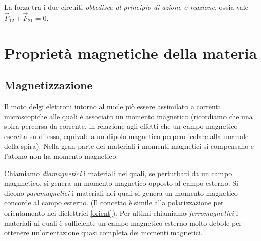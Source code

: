 \documentclass[x11names]{report}
\begin{document}
La forza tra i due circuiti \textit{obbedisce al principio di azione e reazione}, ossia vale \(\vec{F}_{12} + \vec{F}_{21} = 0\).


\newpage
\section{Proprietà magnetiche della materia}

\subsection{Magnetizzazione}
Il moto delgi elettroni intorno al nucle piò essere assimilato a correnti microscopiche alle quali è associato un momento magnetico (ricordiamo che una spira percorsa da corrente, in relazione agli effetti che un campo magnetico esercita su di essa, equivale a un dipolo magnetico perpendicolare alla normale della spira). Nella gran parte dei materiali i momenti magnetici si compensano e l'atomo non ha momento magnetico.

Chiamiamo \textit{diamagnetici} i materiali nei quali, se perturbati da un campo magnnetico, si genera un momento magnetico opposto al campo esterno. Si dicono  \textit{paramagnetici} i materiali nei quali si genera un momento magnetico concorde al campo esterno. (Il concetto è simile alla polarizzazione per orientamento nei dielettrici \ref{orient}). Per ultimi chiamiamo \textit{ferromagnetici}  i materiali ai quali è sufficiente un campo magnetico esterno molto debole per ottenere un'orientazione quasi completa dei momenti magnetici.
\end{document}
